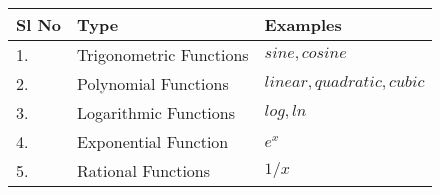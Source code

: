 \documentclass[float=false, crop=false]{standalone}
\begin{document}
\begin{table}[h!]
\centering
\begin{tabular}{l|l|l}
\hline
\textbf{Sl No} & \textbf{Type} & \textbf{Examples}\\
\hline
1. & Trigonometric Functions & $sine,cosine$\\
\hline
2. & Polynomial Functions & $linear,quadratic,cubic$\\
\hline 
3. & Logarithmic Functions & $log,ln$\\
\hline 
4. & Exponential Function & $e^x$\\
\hline
5. & Rational Functions & $1/x$\\
\hline
\end{tabular}
\end{table}
\end{document}
